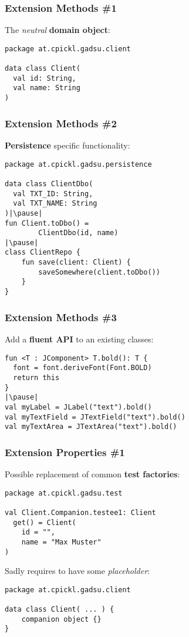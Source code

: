 


\begin{frame}[fragile] \frametitle{Extension Methods \#1}
The \textit{neutral} \textbf{domain object}:
\begin{lstlisting}
package at.cpickl.gadsu.client

data class Client(
  val id: String,
  val name: String
)
\end{lstlisting}
\end{frame}

\begin{frame}[fragile] \frametitle{Extension Methods \#2}
\textbf{Persistence} specific functionality:
\begin{lstlisting}
package at.cpickl.gadsu.persistence

data class ClientDbo(
  val TXT_ID: String,
  val TXT_NAME: String
)|\pause|
fun Client.toDbo() =
        ClientDbo(id, name)
|\pause|
class ClientRepo {
    fun save(client: Client) {
        saveSomewhere(client.toDbo())
    }
}
\end{lstlisting}
\end{frame}


\begin{frame}[fragile] \frametitle{Extension Methods \#3}
Add a \textbf{fluent API} to an existing classes:
\begin{lstlisting}
fun <T : JComponent> T.bold(): T {
  font = font.deriveFont(Font.BOLD)
  return this
}
|\pause|
val myLabel = JLabel("text").bold()
val myTextField = JTextField("text").bold()
val myTextArea = JTextArea("text").bold()
\end{lstlisting}
\end{frame}

\begin{frame}[fragile] \frametitle{Extension Properties \#1}
Possible replacement of common \textbf{test factories}:
\begin{lstlisting}
package at.cpickl.gadsu.test

val Client.Companion.testee1: Client
  get() = Client(
    id = "",
    name = "Max Muster"
)
\end{lstlisting}
\pause

Sadly requires to have some \textit{placeholder}:
\begin{lstlisting}
package at.cpickl.gadsu.client

data class Client( ... ) {
    companion object {}
}
\end{lstlisting}
\end{frame}

